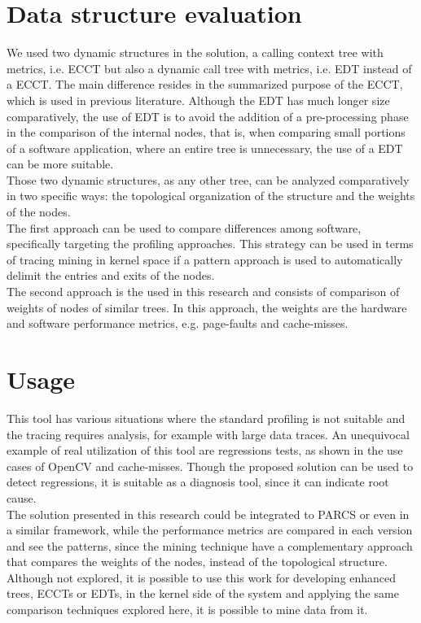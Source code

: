 \section{Data structure evaluation}
We used two dynamic structures in the solution, a calling context tree with metrics, i.e. ECCT but also a dynamic call tree with metrics, i.e. EDT instead of a ECCT. 
The main difference resides in the summarized purpose of the ECCT, which is used in previous literature. Although the EDT has much longer size comparatively, the use of EDT is to avoid the addition of a pre-processing phase in the comparison of the internal nodes, that is, when comparing small portions of a software application, where an entire tree is unnecessary, the use of a EDT can be more suitable.\\
Those two dynamic structures, as any other tree, can be analyzed comparatively in two specific ways: the topological organization of the structure and the weights of the nodes. \\
The first approach can be used to compare differences among software, specifically targeting the profiling approaches. This strategy can be used in terms of tracing mining in kernel space if a pattern approach is used to automatically delimit the entries and exits of the nodes.\\
The second approach is the used in this research and consists of comparison of weights of nodes of similar trees. In this approach, the weights are the hardware and software performance metrics, e.g. page-faults and cache-misses.
\section{Usage}
This tool has various situations where the standard profiling is not suitable and the tracing requires analysis, for example with large data traces.
An unequivocal example of real utilization of this tool are regressions tests, as shown in the use cases of OpenCV and cache-misses. Though the proposed solution can be used to detect regressions, it is suitable as a diagnosis tool, since it can indicate root cause.\\
The solution presented in this research could be integrated to PARCS or even in a similar framework, while the performance metrics are compared in each version and see the patterns, since the mining technique have a complementary approach that compares the weights of the nodes, instead of the topological structure. \\
Although not explored, it is possible to use this work for developing enhanced trees, ECCTs or EDTs, in the kernel side of the system and applying the same comparison techniques explored here, it is possible to mine data from it.
